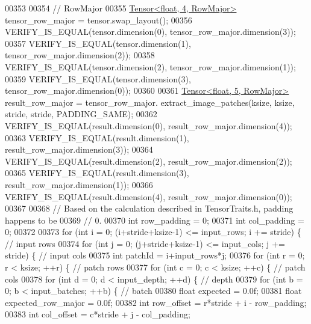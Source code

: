 \begin{DoxyCode}
00353 
00354   \textcolor{comment}{// RowMajor}
00355   \hyperlink{class_eigen_1_1_tensor}{Tensor<float, 4, RowMajor>} tensor\_row\_major = tensor.swap\_layout();
00356   VERIFY\_IS\_EQUAL(tensor.dimension(0), tensor\_row\_major.dimension(3));
00357   VERIFY\_IS\_EQUAL(tensor.dimension(1), tensor\_row\_major.dimension(2));
00358   VERIFY\_IS\_EQUAL(tensor.dimension(2), tensor\_row\_major.dimension(1));
00359   VERIFY\_IS\_EQUAL(tensor.dimension(3), tensor\_row\_major.dimension(0));
00360 
00361   \hyperlink{class_eigen_1_1_tensor}{Tensor<float, 5, RowMajor>} result\_row\_major = tensor\_row\_major.
      extract\_image\_patches(ksize, ksize, stride, stride, PADDING\_SAME);
00362   VERIFY\_IS\_EQUAL(result.dimension(0), result\_row\_major.dimension(4));
00363   VERIFY\_IS\_EQUAL(result.dimension(1), result\_row\_major.dimension(3));
00364   VERIFY\_IS\_EQUAL(result.dimension(2), result\_row\_major.dimension(2));
00365   VERIFY\_IS\_EQUAL(result.dimension(3), result\_row\_major.dimension(1));
00366   VERIFY\_IS\_EQUAL(result.dimension(4), result\_row\_major.dimension(0));
00367 
00368   \textcolor{comment}{// Based on the calculation described in TensorTraits.h, padding happens to be}
00369   \textcolor{comment}{// 0.}
00370   \textcolor{keywordtype}{int} row\_padding = 0;
00371   \textcolor{keywordtype}{int} col\_padding = 0;
00372 
00373   \textcolor{keywordflow}{for} (\textcolor{keywordtype}{int} i = 0; (i+stride+ksize-1) <= input\_rows; i += stride) \{  \textcolor{comment}{// input rows}
00374     \textcolor{keywordflow}{for} (\textcolor{keywordtype}{int} j = 0; (j+stride+ksize-1) <= input\_cols; j += stride) \{  \textcolor{comment}{// input cols}
00375       \textcolor{keywordtype}{int} patchId = i+input\_rows*j;
00376       \textcolor{keywordflow}{for} (\textcolor{keywordtype}{int} r = 0; r < ksize; ++r) \{  \textcolor{comment}{// patch rows}
00377         \textcolor{keywordflow}{for} (\textcolor{keywordtype}{int} c = 0; c < ksize; ++c) \{  \textcolor{comment}{// patch cols}
00378           \textcolor{keywordflow}{for} (\textcolor{keywordtype}{int} d = 0; d < input\_depth; ++d) \{  \textcolor{comment}{// depth}
00379             \textcolor{keywordflow}{for} (\textcolor{keywordtype}{int} b = 0; b < input\_batches; ++b) \{  \textcolor{comment}{// batch}
00380               \textcolor{keywordtype}{float} expected = 0.0f;
00381               \textcolor{keywordtype}{float} expected\_row\_major = 0.0f;
00382               \textcolor{keywordtype}{int} row\_offset = r*stride + i - row\_padding;
00383               \textcolor{keywordtype}{int} col\_offset = c*stride + j - col\_padding;

\end{DoxyCode}

